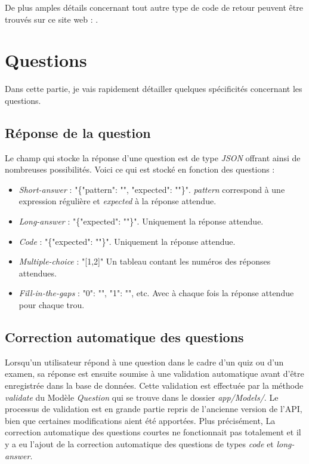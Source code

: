 De plus amples détails concernant tout autre type de code de retour peuvent être trouvés sur ce site web : \cite{StatusCode}.

\section{Questions}

Dans cette partie, je vais rapidement détailler quelques spécificités concernant les questions.

\subsection{Réponse de la question}
Le champ qui stocke la réponse d'une question est de type \emph{JSON} offrant ainsi de nombreuses possibilités. Voici ce qui est stocké en fonction des questions :
\begin{itemize}
    \item \emph{Short-answer} : "\{"pattern": "", "expected": ""\}". \emph{pattern} correspond à une expression régulière et \emph{expected} à la réponse attendue.
    \item \emph{Long-answer} : "\{"expected": ""\}". Uniquement la réponse attendue.
    \item \emph{Code} : "\{"expected": ""\}". Uniquement la réponse attendue.
    \item \emph{Multiple-choice} : "[1,2]" Un tableau contant les numéros des réponses attendues.
    \item \emph{Fill-in-the-gaps} : {"0": "", "1": "", etc.} Avec à chaque fois la réponse attendue pour chaque trou.
\end{itemize}

\subsection{Correction automatique des questions}
Lorsqu'un utilisateur répond à une question dans le cadre d'un quiz ou d'un examen, sa réponse est ensuite soumise à une validation automatique avant d'être enregistrée dans la base de données. Cette validation est effectuée par la méthode \emph{validate} du Modèle \emph{Question} qui se trouve dans le dossier \emph{app/Models/}. Le processus de validation est en grande partie repris de l'ancienne version de l'API, bien que certaines modifications aient été apportées. Plus précisément, La correction automatique des questions courtes ne fonctionnait pas totalement et il y a eu l'ajout de la correction automatique des questions de types \emph{code} et \emph{long-answer}.

